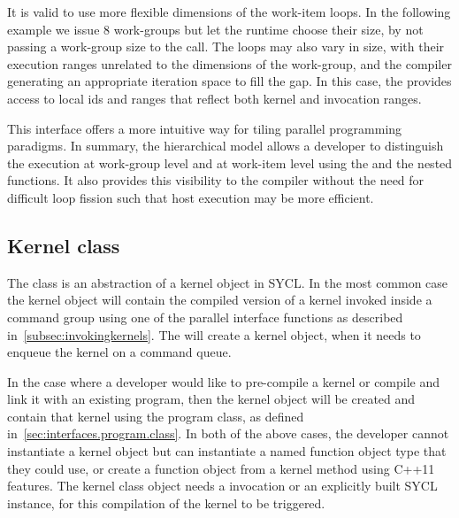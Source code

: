 It is valid to use more flexible dimensions of the work-item loops. In
the following example we issue 8 work-groups but let the runtime
choose their size, by not passing a work-group size to the
 call. The
 loops may also vary in size, with
their execution ranges unrelated to the dimensions of the work-group,
and the compiler generating an appropriate iteration space to fill the
gap. In this case, the  provides access to local ids and
ranges that reflect both kernel and  invocation ranges.



This interface offers a more intuitive way for tiling parallel
programming paradigms. In summary, the hierarchical model allows a
developer to distinguish the execution at work-group level and at
work-item level using the  and the nested
 functions. It also provides this visibility
to the compiler without the need for difficult loop fission such that
host execution may be more efficient.




\subsection{Kernel class}
\label{subsec:kernel.class}

The  class is an abstraction of a \gls{kernel} object
in SYCL. In the
most common case the kernel object will contain the compiled version of a kernel
invoked inside a command group using one of the parallel interface functions as
described in~\ref{subsec:invokingkernels}. The  will create 
a kernel object, when it needs to enqueue the kernel on a command queue.

In the case where a developer would like to pre-compile a kernel or compile and
link it with an existing program, then the kernel object will be created and
contain that kernel using the program class, as defined
in~\ref{sec:interfaces.program.class}. In both of the above cases, the developer
cannot instantiate a kernel object but can instantiate a named function object type
that they could use, or create a function object from a kernel method using C++11 features.
The kernel class object needs a  invocation or an
explicitly built SYCL  instance, for this compilation of the kernel to be triggered.

